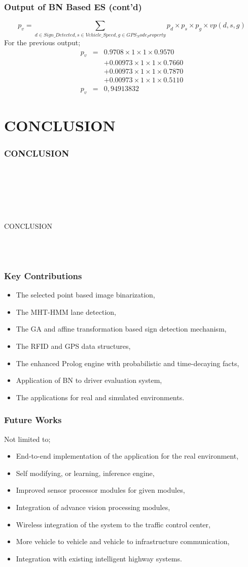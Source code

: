 \documentclass{beamer}
\newcommand{\mysectionpage}[2]{
	\begin{frame}
		\frametitle{#1}
		~\\~
		\begin{block}{}
			~\\~
			\begin{center}
				#2
			\end{center}
			~\\~
		\end{block}
	\end{frame}
}
\begin{document}
\begin{frame}
	\frametitle{Output of BN Based ES (cont'd)} 
	{\footnotesize
	\begin{equation}
	\label{eq14}
		p_{v} = \sum_{d\in{Sign\_Detected},s\in{Vehicle\_Speed},g\in{GPS_Node_Property}}p_{d} \times p_{s} \times p_{g} \times vp(d,s,g)
	\end{equation}
	}	
	For the previous output;
	\begin{eqnarray}
	\label{eq15}
	p_{v} &=& 0.9708 \times 1 \times 1 \times 0.9570 \\
	\nonumber & & + 0.00973 \times 1 \times 1 \times 0.7660  \\
	\nonumber & & + 0.00973 \times 1 \times 1 \times 0.7870  \\
	\nonumber & & + 0.00973 \times 1 \times 1 \times 0.5110  \\
	\nonumber p_{v} &=& 0,94913832
	\end{eqnarray}
\end{frame}

\section{CONCLUSION}
\mysectionpage{CONCLUSION}{CONCLUSION}

\begin{frame}
	\frametitle{Key Contributions} 
	\begin{itemize}
	\item The selected point based image binarization, 
	\item The MHT-HMM lane detection, 
	\item The GA and affine transformation based sign detection mechanism, 
	\item The RFID and GPS data structures, 
	\item The enhanced Prolog engine with probabilistic and time-decaying facts, 
	\item Application of BN to driver evaluation system,
	\item The applications for real and simulated environments.
  \end{itemize}
\end{frame}	

\begin{frame}
	\frametitle{Future Works} 
	Not limited to;
	\begin{itemize}
	\item End-to-end implementation of the application for the real environment,
	\item Self modifying, or learning, inference engine,
	\item Improved sensor processor modules for given modules,
	\item Integration of advance vision processing modules,
	\item Wireless integration of the system to the traffic control center,
	\item More vehicle to vehicle and vehicle to infrastructure communication,
	\item Integration with existing intelligent highway systems.
  \end{itemize}	
\end{frame}	
\end{document}
